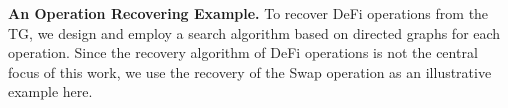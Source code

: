 %
%
%
%
%


\noindent\textbf{An Operation Recovering Example.}
To recover DeFi operations from the TG, we design and employ a search algorithm based on directed graphs for each operation. Since the recovery algorithm of DeFi operations is not the central focus of this work, we use the recovery of the Swap operation as an illustrative example here.

